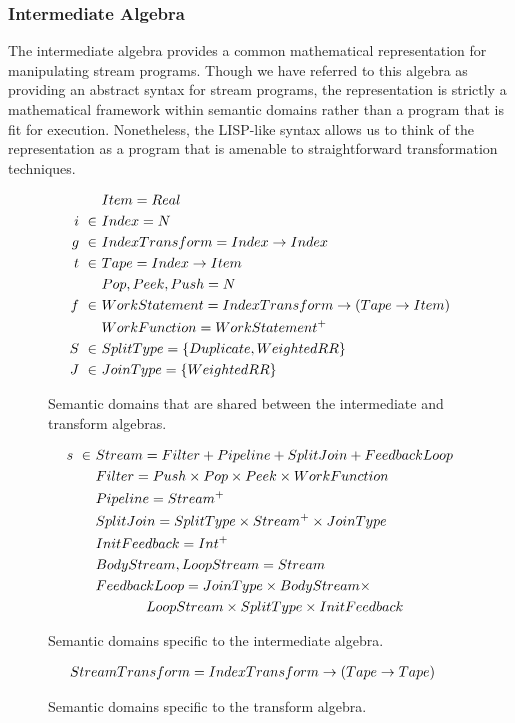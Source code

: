 \subsubsection{Intermediate Algebra}
\label{sec:intalgebra}

The intermediate algebra provides a common mathematical representation
for manipulating stream programs.  Though we have referred to this
algebra as providing an abstract syntax for stream programs, the
representation is strictly a mathematical framework within semantic
domains rather than a program that is fit for execution.  Nonetheless,
the LISP-like syntax allows us to think of the representation as a
program that is amenable to straightforward transformation techniques.

\begin{figure}
\begin{align*}
&Item = Real \\
i~\in~&Index = N \\
g~\in~&IndexTransform = Index \rightarrow Index \\
t~\in~&Tape = Index \rightarrow Item \\
&Pop, Peek, Push = N \\ 
f~\in~&WorkStatement = IndexTransform \rightarrow (Tape \rightarrow Item) \\ 
&WorkFunction = WorkStatement^{+} \\
S~\in~&SplitType = \{Duplicate, WeightedRR\} \\ 
J~\in~&JoinType = \{WeightedRR\}
\end{align*}
\vspace{-18pt}
\caption{Semantic domains that are shared between the intermediate and
  transform algebras.
\protect\label{fig:shareddom}}
\vspace{-6pt}
\begin{align*}
s~\in~&Stream = Filter + Pipeline + SplitJoin + FeedbackLoop \\
&Filter = Push \times Pop \times Peek \times WorkFunction \\
&Pipeline = Stream^{+} \\
&SplitJoin = SplitType \times Stream^{+} \times JoinType \\
&InitFeedback = Int^{+} \\
&BodyStream, LoopStream = Stream \\
&FeedbackLoop = JoinType \times BodyStream \times \\
& \hspace{0.5in} LoopStream \times SplitType \times InitFeedback
\end{align*}
\vspace{-18pt}
\caption{Semantic domains specific to the intermediate algebra.
\protect\label{fig:interdom}}
\vspace{-6pt}
\begin{align*}
&StreamTransform = IndexTransform \rightarrow (Tape \rightarrow Tape)
\end{align*}
\caption{Semantic domains specific to the transform algebra.
\protect\label{fig:transformdom}}
\end{figure}

